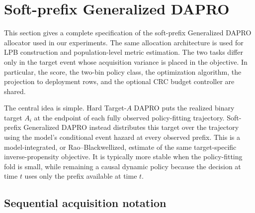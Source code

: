 
\section{Soft-prefix Generalized DAPRO}
\label{sec:spgd}

This section gives a complete specification of the soft-prefix Generalized
DAPRO allocator used in our experiments.  The same allocation architecture is
used for LPB construction and population-level metric estimation.  The two
tasks differ only in the target event whose acquisition variance is placed in
the objective.  In particular, the score, the two-bin policy class, the
optimization algorithm, the projection to deployment rows, and the optional
CRC budget controller are shared.

The central idea is simple.  Hard Target-$A$ DAPRO puts the realized binary
target $A_i$ at the endpoint of each fully observed policy-fitting trajectory.
Soft-prefix Generalized DAPRO instead distributes this target over the
trajectory using the model's conditional event hazard at every observed
prefix.  This is a model-integrated, or Rao--Blackwellized, estimate of the
same target-specific inverse-propensity objective.  It is typically more
stable when the policy-fitting fold is small, while remaining a causal dynamic
policy because the decision at time $t$ uses only the prefix available at
time $t$.

\subsection{Sequential acquisition notation}


